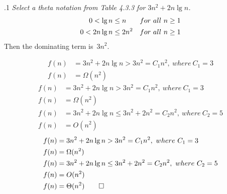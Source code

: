 \documentclass{beamer}
\begin{document}
        \begin{frame}[c,shrink]{\subsecname{}.1}
            \textit{Select a theta notation from Table 4.3.3 for $3n^2+2n\lg{n}$.}\pause     
            \begin{align*}
                0 < \lg{n}		&\leq n 	\hfill &for\ all\ n \geq 1\\
                0 < 2n\lg{n} 	&\leq 2n^2 \hfill &for\ all\ n \geq 1
            \end{align*}\pause
            Then the dominating term is\ $3n^2$.\\ \pause
            \begin{overprint}
            \begin{align*}
            f(n)&= 3n^2+2n\lg{n} > 3n^2=C_1n^2,\ where\ C_1=3\\
            f(n)&=\Omega(n^2)
            \end{align*}
            \begin{align*}
            f(n)&= 3n^2+2n\lg{n} > 3n^2=C_1n^2,\ where\ C_1=3\\
            f(n)&=\Omega(n^2)\\
            f(n)&= 3n^2+2n\lg{n} \leq 3n^2+2n^2=C_2n^2,\ where\ C_2=5\\
            f(n)&=O(n^2)
            \end{align*}
            \begin{align*}
            f(n)	&= 3n^2+2n\lg{n} > 3n^2=C_1n^2,\ where\ C_1=3\\
            f(n)	&= \Omega(n^2)\\
            f(n)	&= 3n^2+2n\lg{n} \leq 3n^2+2n^2=C_2n^2,\ where\ C_2=5\\
            f(n)	&= O(n^2)\\
            f(n)	&= \Theta(n^2)  \qed
            \end{align*}
            \end{overprint}
        \end{frame}
        
\end{document}
